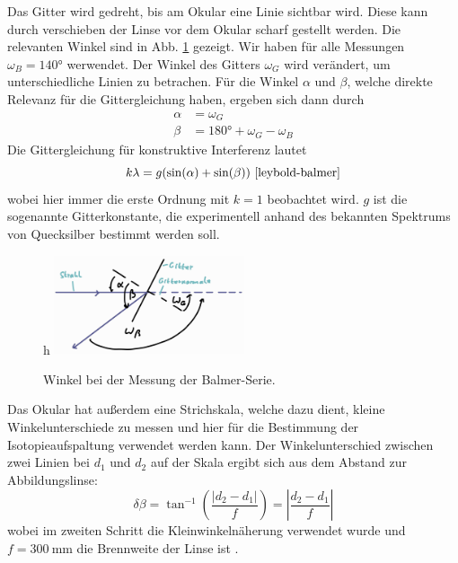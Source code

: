 \documentclass{article}
\begin{document}
Das Gitter wird gedreht, bis am Okular eine Linie sichtbar wird. Diese kann durch verschieben der Linse vor dem Okular scharf gestellt werden.
Die relevanten Winkel sind in Abb. \ref{fig:balmer-winkel} gezeigt. Wir haben für alle Messungen $\omega_B = \ang{140}$ werwendet.
Der Winkel des Gitters $\omega_G$ wird verändert, um unterschiedliche Linien zu betrachen. Für die Winkel $\alpha$ und $\beta$, welche
direkte Relevanz für die Gittergleichung haben, ergeben sich dann durch
\begin{align}
  \alpha &= \omega_G \nonumber \\
  \beta &= \ang{180} + \omega_G - \omega_B \label{eq:balmer-winkel}
\end{align}
Die Gittergleichung für konstruktive Interferenz lautet
\begin{equation}
  k\lambda = g(\sin(\alpha) + \sin(\beta)) \label{eq:gittergleichung}\ \cite{leybold-balmer}
\end{equation}
wobei hier immer die erste Ordnung mit $k=1$ beobachtet wird. $g$ ist die sogenannte Gitterkonstante,
die experimentell anhand des bekannten Spektrums von Quecksilber bestimmt werden soll.

\begin{figure}{h}
  \centering
  \includegraphics[width=0.5\textwidth]{balmer-winkel}
  \caption{Winkel bei der Messung der Balmer-Serie.}
  \label{fig:balmer-winkel}
\end{figure}

Das Okular hat außerdem eine Strichskala, welche dazu dient, kleine Winkelunterschiede zu messen und
hier für die Bestimmung der Isotopieaufspaltung verwendet werden kann.
Der Winkelunterschied zwischen zwei Linien bei $d_1$ und $d_2$ auf der Skala ergibt sich aus dem Abstand zur Abbildungslinse:
\begin{equation}
  \delta \beta = \tan^{-1}\left(\frac{\lvert d_2-d_1 \rvert}{f}\right) = \left\lvert \frac{d_2-d_1}{f} \right\rvert \label{eq:}
\end{equation}
wobei im zweiten Schritt die Kleinwinkelnäherung verwendet wurde und $f=\SI{300}{\mm}$ die Brennweite der Linse ist \cite{Anleitung}.
\end{document}
